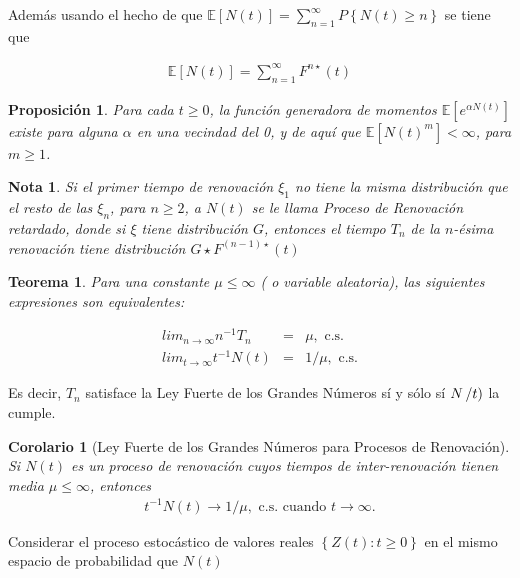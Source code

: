 \documentclass{article}
\newtheorem{Teo}{Teorema}
\newtheorem{Note}{Nota}
\newtheorem{Prop}{Proposición}
\newtheorem{Coro}{Corolario}
\newcommand{\esp}{\mathbb{E}}
\begin{document}
Adem\'as usando el hecho de que $\esp\left[N\left(t\right)\right]=\sum_{n=1}^{\infty}P\left\{N\left(t\right)\geq n\right\}$
se tiene que

\begin{eqnarray*}
\esp\left[N\left(t\right)\right]=\sum_{n=1}^{\infty}F^{n\star}\left(t\right)
\end{eqnarray*}

\begin{Prop}
Para cada $t\geq0$, la funci\'on generadora de momentos $\esp\left[e^{\alpha N\left(t\right)}\right]$ existe para alguna $\alpha$ en una vecindad del 0, y de aqu\'i que $\esp\left[N\left(t\right)^{m}\right]<\infty$, para $m\geq1$.
\end{Prop}


\begin{Note}
Si el primer tiempo de renovaci\'on $\xi_{1}$ no tiene la misma distribuci\'on que el resto de las $\xi_{n}$, para $n\geq2$, a $N\left(t\right)$ se le llama Proceso de Renovaci\'on retardado, donde si $\xi$ tiene distribuci\'on $G$, entonces el tiempo $T_{n}$ de la $n$-\'esima renovaci\'on tiene distribuci\'on $G\star F^{\left(n-1\right)\star}\left(t\right)$
\end{Note}


\begin{Teo}
Para una constante $\mu\leq\infty$ ( o variable aleatoria), las siguientes expresiones son equivalentes:

\begin{eqnarray}
lim_{n\rightarrow\infty}n^{-1}T_{n}&=&\mu,\textrm{ c.s.}\\
lim_{t\rightarrow\infty}t^{-1}N\left(t\right)&=&1/\mu,\textrm{ c.s.}
\end{eqnarray}
\end{Teo}


Es decir, $T_{n}$ satisface la Ley Fuerte de los Grandes N\'umeros s\'i y s\'olo s\'i $N\left/t\right)$ la cumple.


\begin{Coro}[Ley Fuerte de los Grandes N\'umeros para Procesos de Renovaci\'on]
Si $N\left(t\right)$ es un proceso de renovaci\'on cuyos tiempos de inter-renovaci\'on tienen media $\mu\leq\infty$, entonces
\begin{eqnarray}
t^{-1}N\left(t\right)\rightarrow 1/\mu,\textrm{ c.s. cuando }t\rightarrow\infty.
\end{eqnarray}

\end{Coro}


Considerar el proceso estoc\'astico de valores reales $\left\{Z\left(t\right):t\geq0\right\}$ en el mismo espacio de probabilidad que $N\left(t\right)$
\end{document}
